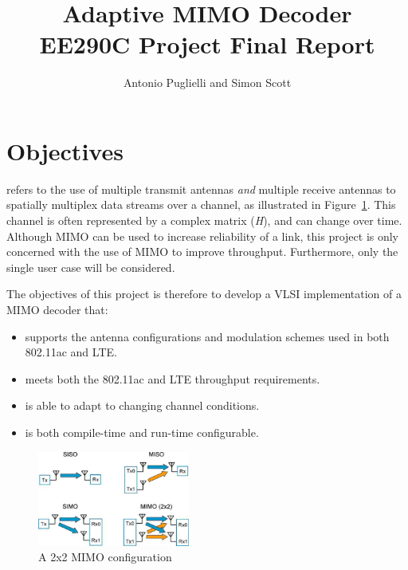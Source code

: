 \documentclass[journal]{IEEEtran}
\begin{document}
\title{Adaptive MIMO Decoder \\ {\Large EE290C Project Final Report}}

%

\author{Antonio Puglielli and Simon Scott}


\maketitle

\section{Objectives}

 refers to the use of multiple transmit antennas {\em and} multiple receive antennas to spatially multiplex data streams over a channel, as illustrated in Figure~\ref{mimo_cartoon}. This channel is often represented by a complex matrix ({\em H}), and can change over time. Although MIMO can be used to increase reliability of a link, this project is only concerned with the use of MIMO to improve throughput. Furthermore, only the single user case will be considered.

The objectives of this project is therefore to develop a VLSI implementation of a MIMO decoder that:
\begin{itemize}
\item supports the antenna configurations and modulation schemes used in both 802.11ac and LTE.
\item meets both the 802.11ac and LTE throughput requirements.
\item is able to adapt to changing channel conditions.
\item is both compile-time and run-time configurable.
\end{itemize}

\begin{figure}[!h]
\centering
\includegraphics*[width=5cm, viewport = 300 0 560 130]{images/agilent_mimo.jpg}
\caption{A 2x2 MIMO configuration}
\label{mimo_cartoon}
\end{figure}
\end{document}
